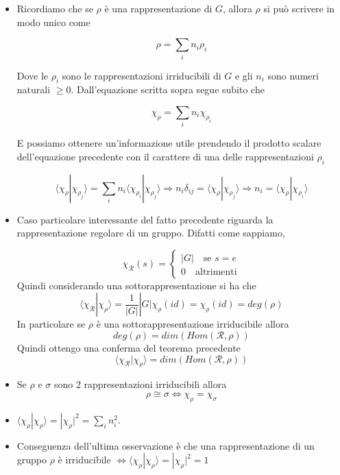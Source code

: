 \documentclass[11pt]{article}
\theoremstyle{plain}
\theoremstyle{definition}
\theoremstyle{remark}
\newcommand{\dsum}{\displaystyle\sum}
\begin{document}
\begin{itemize}
\item Ricordiamo che se $\rho$ è una rappresentazione di $G$, allora $\rho$ si può scrivere in modo unico come 

\[ \rho = \dsum_i n_i \rho_i\]

Dove le $\rho_i$ sono le rappresentazioni irriducibili di $G$ e gli $n_i$ sono numeri naturali $\geq 0$. Dall'equazione scritta sopra segue subito che

\[ \chi_\rho = \dsum_i n_i \chi_{\rho_i}\]

E possiamo ottenere un'informazione utile prendendo il prodotto scalare dell'equazione precedente con il carattere di una delle rappresentazioni $\rho_i$

\[ \langle \chi_\rho | \chi_{\rho_j} \rangle = \dsum_i n_i \langle \chi_{\rho_i} | \chi_{\rho_j} \rangle \Rightarrow n_i \delta_{ij} = \langle \chi_\rho | \chi_{\rho_j} \rangle \Rightarrow n_i = \langle \chi_\rho | \chi_{\rho_i} \rangle\]

\item Caso particolare interessante del fatto precedente riguarda la rappresentazione regolare di un gruppo. Difatti come sappiamo,

\[ \chi_{\mathcal{R}}(s) = 
\begin{cases}
|G| \quad \text{se } s = e \\
0 \quad \text{altrimenti}
\end{cases}\]
Quindi considerando una sottorappresentazione  si ha che 
\[
\langle \chi_{\mathcal{R}} | \chi_\rho \rangle = \frac{1}{|G|}|G|\chi_{\rho}(id)=\chi_{\rho}(id)=deg(\rho)
\]
In particolare se $\rho$ è una sottorappresentazione irriducibile allora
\[ deg(\rho)=dim(Hom(\mathcal{R},\rho)) \]
Quindi ottengo una conferma del teorema precedente 
\[      
\langle \chi_{\mathcal{R}} | \chi_\rho \rangle =dim(Hom(\mathcal{R},\rho))
\]

\item Se $\rho$ e $\sigma$ sono 2 rappresentazioni irriducibili allora $$\rho \cong \sigma \Leftrightarrow \chi_{\rho}=\chi_{\sigma}$$

\item $\langle \chi_\rho | \chi_\rho \rangle = |\chi_\rho|^2 = \sum_i n_i^2$.
\item Conseguenza dell'ultima osservazione è che una rappresentazione di un gruppo $\rho$ è irriducibile $\Leftrightarrow \langle \chi_\rho | \chi_\rho \rangle = |\chi_\rho|^2 = 1$ 


\end{itemize}
\end{document}
